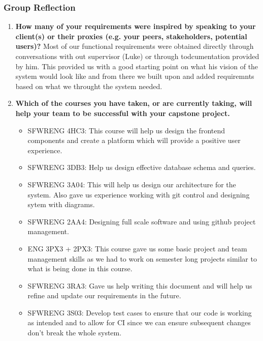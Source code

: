 
\subsubsection*{Group Reflection}
\begin{enumerate}
  \item \textbf{How many of your requirements were inspired by speaking to your client(s) or their proxies (e.g. your peers, stakeholders, potential users)?}
  Most of our functional requirements were obtained directly through conversations with out supervisor (Luke) or through todcumentation provided by him. This provided us with a good starting point on what his vision of the system would look like and from there we built upon and added requiremnts based on what we throught the system needed.

  \item \textbf{Which of the courses you have taken, or are currently taking, will help your team to be successful with your capstone project.}
  \begin{itemize}
      \item SFWRENG 4HC3: This course will help us design the frontend components and create a platform which will provide a positive user experience.
      \item SFWRENG 3DB3: Help us design effective database schema and queries.
      \item SFWRENG 3A04: This will help us design our architecture for the system. Also gave us experience working with git control and designing sytem with diagrams.
      \item SFWRENG 2AA4: Designing full scale software and using github project management.
      \item ENG 3PX3 + 2PX3: This course gave us some basic project and team management skills as we had to work on semester long projects similar to what is being done in this course.
      \item SFWRENG 3RA3: Gave us help writing this document and will help us refine and update our requirements in the future.
      \item SFWRENG 3S03: Develop test cases to ensure that our code is working as intended and to allow for CI since we can ensure subsequent changes don't break the whole system.
  \end{itemize}


\end{enumerate}
